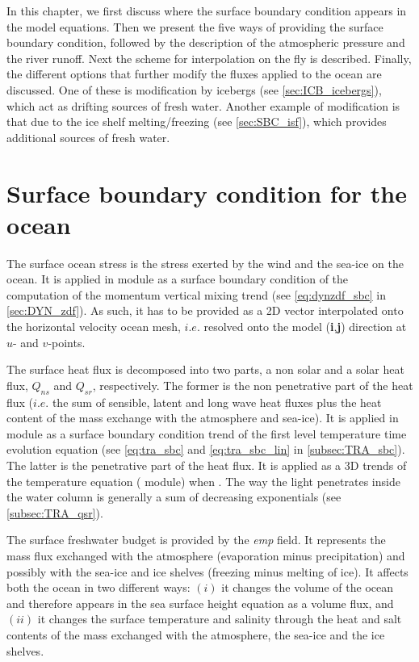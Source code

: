 \documentclass[../tex_main/NEMO_manual]{subfiles}
\begin{document}
In this chapter, we first discuss where the surface boundary condition appears in the model equations.
Then we present the five ways of providing the surface boundary condition, 
followed by the description of the atmospheric pressure and the river runoff. 
Next the scheme for interpolation on the fly is described.
Finally, the different options that further modify the fluxes applied to the ocean are discussed.
One of these is modification by icebergs (see \autoref{sec:ICB_icebergs}),
which act as drifting sources of fresh water.
Another example of modification is that due to the ice shelf melting/freezing (see \autoref{sec:SBC_isf}), 
which provides additional sources of fresh water.


\section{Surface boundary condition for the ocean}
\label{sec:SBC_general}

The surface ocean stress is the stress exerted by the wind and the sea-ice on the ocean.
It is applied in  module as a surface boundary condition of the computation of
the momentum vertical mixing trend (see \autoref{eq:dynzdf_sbc} in \autoref{sec:DYN_zdf}).
As such, it has to be provided as a 2D vector interpolated onto the horizontal velocity ocean mesh,
$i.e.$ resolved onto the model (\textbf{i},\textbf{j}) direction at $u$- and $v$-points.

The surface heat flux is decomposed into two parts, a non solar and a solar heat flux,
$Q_{ns}$ and $Q_{sr}$, respectively.
The former is the non penetrative part of the heat flux
($i.e.$ the sum of sensible, latent and long wave heat fluxes plus
the heat content of the mass exchange with the atmosphere and sea-ice).
It is applied in  module as a surface boundary condition trend of
the first level temperature time evolution equation
(see \autoref{eq:tra_sbc} and \autoref{eq:tra_sbc_lin} in \autoref{subsec:TRA_sbc}). 
The latter is the penetrative part of the heat flux.
It is applied as a 3D trends of the temperature equation ( module) when
.
The way the light penetrates inside the water column is generally a sum of decreasing exponentials
(see \autoref{subsec:TRA_qsr}). 

The surface freshwater budget is provided by the \textit{emp} field.
It represents the mass flux exchanged with the atmosphere (evaporation minus precipitation) and
possibly with the sea-ice and ice shelves (freezing minus melting of ice).
It affects both the ocean in two different ways:
$(i)$  it changes the volume of the ocean and therefore appears in the sea surface height equation as
a volume flux, and 
$(ii)$ it changes the surface temperature and salinity through the heat and salt contents of
the mass exchanged with the atmosphere, the sea-ice and the ice shelves. 
\end{document}
